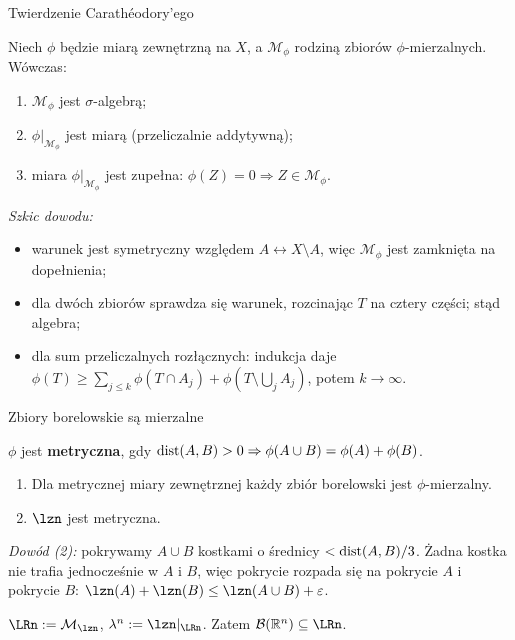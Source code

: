 \documentclass[aspectratio=169,11pt,t,envcountsect,professionalfonts]{beamer}
\begin{document}
\begin{frame}{Twierdzenie Carathéodory'ego}
  \begin{mythm}[Carathéodory]
    Niech $\phi$ będzie miarą zewnętrzną na $X$, a $\mathcal{M}_\phi$ rodziną zbiorów $\phi$-mierzalnych. Wówczas:
    \begin{enumerate}
      \item $\mathcal{M}_\phi$ jest $\sigma$-algebrą;
      \item $\phi|_{\mathcal{M}_\phi}$ jest miarą (przeliczalnie addytywną);
      \item miara $\phi|_{\mathcal{M}_\phi}$ jest zupełna: $\phi(Z) = 0 \Rightarrow Z \in \mathcal{M}_\phi$.
    \end{enumerate}
  \end{mythm}

  \textit{Szkic dowodu:}
  \begin{itemize}
    \item warunek jest symetryczny względem $A \leftrightarrow X \setminus A$, więc $\mathcal{M}_\phi$ jest zamknięta na dopełnienia;
    \item dla dwóch zbiorów sprawdza się warunek, rozcinając $T$ na cztery części; stąd algebra;
    \item dla sum przeliczalnych rozłącznych: indukcja daje $\phi(T) \ge \sum_{j\le k} \phi(T \cap A_j) + \phi(T \setminus \bigcup_j A_j)$, potem $k \to \infty$.
  \end{itemize}
\end{frame}

\begin{frame}{Zbiory borelowskie są mierzalne}
  \begin{mydef}
    $\phi$ jest \textbf{metryczna}, gdy $\operatorname{dist}(A,B) > 0 \Rightarrow \phi(A \cup B) = \phi(A) + \phi(B)$.
  \end{mydef}

  \begin{mythm}
    \begin{enumerate}
      \item Dla metrycznej miary zewnętrznej każdy zbiór borelowski jest $\phi$-mierzalny.
      \item $\lzn$ jest metryczna.
    \end{enumerate}
  \end{mythm}

  \textit{Dowód (2):} pokrywamy $A \cup B$ kostkami o średnicy $< \operatorname{dist}(A,B)/3$. Żadna kostka nie trafia jednocześnie w $A$ i $B$, więc pokrycie rozpada się na pokrycie $A$ i pokrycie $B$: $\lzn(A) + \lzn(B) \le \lzn(A \cup B) + \eps$.

  \begin{mydef}
    $\LRn := \mathcal{M}_{\lzn}$, \quad $\lambda^n := \lzn|_{\LRn}$. \quad Zatem $\BorelRn \subseteq \LRn$.
  \end{mydef}
\end{frame}
\end{document}
